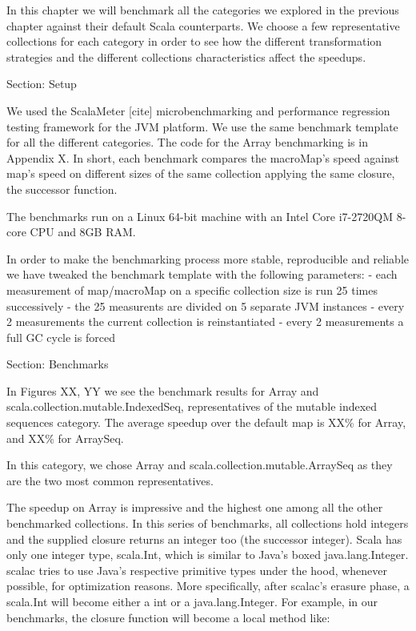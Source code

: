 In this chapter we will benchmark all the categories we explored in
the previous chapter against their default Scala counterparts. We choose a few
representative collections for each category in order to see how the different
transformation strategies and the different collections characteristics affect
the speedups.

Section: Setup

We used the ScalaMeter [cite] microbenchmarking and performance regression
testing framework for the JVM platform. We use the same benchmark template for
all the different categories. The code for the Array benchmarking is in Appendix
X. In short, each benchmark compares the macroMap's speed against map's speed
on different sizes of the same collection applying the same closure, the
successor function.

The benchmarks run on a Linux 64-bit machine with an Intel Core i7-2720QM 8-core
CPU and 8GB RAM.

In order to make the benchmarking process more stable, reproducible and reliable
we have tweaked the benchmark template with the following parameters:
- each measurement of map/macroMap on a specific collection size is run 25
times successively
- the 25 measurents are divided on 5 separate JVM instances
- every 2 measurements the current collection is reinstantiated
- every 2 measurements a full GC cycle is forced


Section: Benchmarks

In Figures XX, YY we see the benchmark results for Array
and scala.collection.mutable.IndexedSeq, representatives of the mutable indexed
sequences category. The average speedup over the default map is XX\% for Array,
and XX\% for ArraySeq.

In this category, we chose Array and scala.collection.mutable.ArraySeq as they
are the two most common representatives.

The speedup on Array is impressive and the highest one among all the other
benchmarked collections. In this series of benchmarks, all collections hold
integers and the supplied closure returns an integer too (the successor
integer). Scala has only one integer type, scala.Int, which is similar to Java's
boxed java.lang.Integer. scalac tries to use Java's respective primitive types
under the hood, whenever possible, for optimization reasons. More specifically,
after scalac's erasure phase, a scala.Int will become either a int or a
java.lang.Integer. For example, in our benchmarks, the closure function will
become a local method like:

